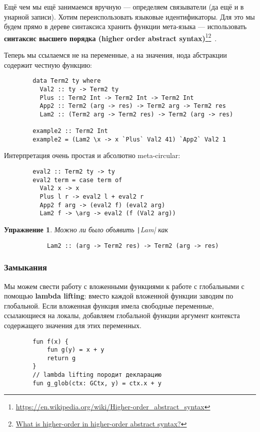 \documentclass[12pt]{article}
\newcommand{\vocab}[1]{\textbf{#1}} %
\newtheorem{task}{Упражнение}
\begin{document}
    Ещё чем мы ещё занимаемся вручную --- определяем связыватели (да ещё и в унарной записи).
    Хотим переиспользовать языковые идентификаторы.
    Для это мы будем прямо в дереве синтаксиса хранить функции мета-языка --- использовать \vocab{синтаксис высшего порядка (higher order abstract syntax)}\footnote{\url{https://en.wikipedia.org/wiki/Higher-order_abstract_syntax}}\footnote{\href{https://cstheory.stackexchange.com/questions/20071/what-is-higher-order-in-higher-order-abstract-syntax}{What is higher-order in higher-order abstract syntax?}}~\cite{pfenning1988higher}.

    Теперь мы ссылаемся не на переменные, а на значения, нода абстракции содержит честную функцию:
    \begin{verbatim}
        data Term2 ty where
          Val2 :: ty -> Term2 ty
          Plus :: Term2 Int -> Term2 Int -> Term2 Int
          App2 :: Term2 (arg -> res) -> Term2 arg -> Term2 res
          Lam2 :: (Term2 arg -> Term2 res) -> Term2 (arg -> res)

        example2 :: Term2 Int
        example2 = (Lam2 \x -> x `Plus` Val2 41) `App2` Val2 1
    \end{verbatim}

    Интерпретация очень простая и абсолютно meta-circular:
    \begin{verbatim}
        eval2 :: Term2 ty -> ty
        eval2 term = case term of
          Val2 x -> x
          Plus l r -> eval2 l + eval2 r
          App2 f arg -> (eval2 f) (eval2 arg)
          Lam2 f -> \arg -> eval2 (f (Val2 arg))
    \end{verbatim}

    \begin{task}
        Можно ли было объявить \texttt|Lam| как
        \begin{verbatim}
            Lam2 :: (arg -> Term2 res) -> Term2 (arg -> res)
        \end{verbatim}
    \end{task}

    \subsubsection{Замыкания} \label{subsubsec:closures}

    Мы можем свести работу с вложенными функциями к работе с глобальными с помощью \vocab{lambda lifting}: вместо каждой вложенной функции заводим по глобальной.
    Если вложенная функция имела свободные переменные, ссылающиеся на локалы, добавляем глобальной функции аргумент контекста содержащего значения для этих переменных.
    \begin{verbatim}
        fun f(x) {
            fun g(y) = x + y
            return g
        }
        // lambda lifting породит декларацию
        fun g_glob(ctx: GCtx, y) = ctx.x + y
    \end{verbatim}
\end{document}
